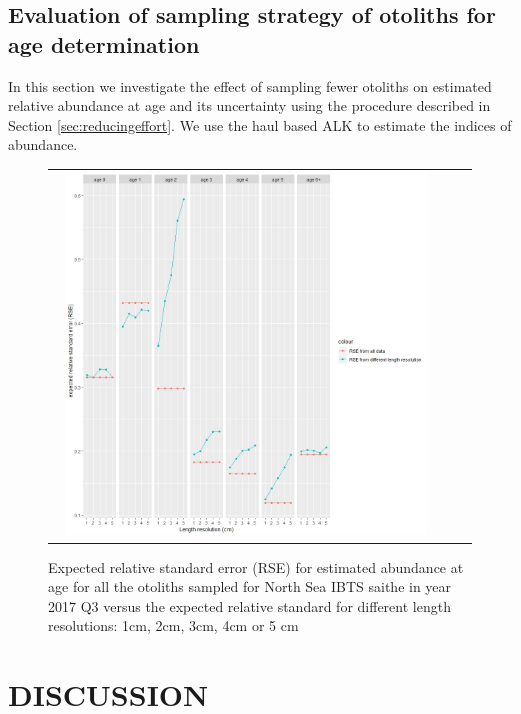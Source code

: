 \documentclass[a4paper 12pt]{article}
\numberwithin{equation}{section}
\begin{document}
\clearpage
\subsection{Evaluation of sampling strategy of otoliths for age determination}
\label{sec:optimumeffortresults}
In this section we investigate the effect of sampling fewer otoliths on estimated relative abundance at age and its uncertainty using the procedure described in Section \ref{sec:reducingeffort}. We use the haul based ALK  to estimate the indices of abundance.

\clearpage
\begin{figure}[h!]
\centering
\begin{tabular}{@{}ccc@{}}
{\includegraphics[width=0.95\textwidth]{figures/remavalSaitheHaul2017.jpeg}} & \\
\end{tabular}
\caption[]{Expected relative standard error (RSE) for estimated abundance at age for all the otoliths sampled for North Sea IBTS saithe in year 2017 Q3 versus the expected relative standard for different length resolutions: 1cm, 2cm, 3cm, 4cm or 5 cm}
\label{RemovalSaithe}
\end{figure} 

\clearpage
\section{DISCUSSION}
\label{sec:discussion}
\end{document}
